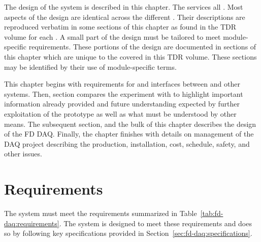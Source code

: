 The design of the    system is described in this chapter. 
The  services all  . 
Most aspects of the design are identical across the different .
Their descriptions are reproduced verbatim in some sections of this  chapter as found in the TDR volume for each .
A small part of the  design must be tailored to meet module-specific requirements. 
These portions of the design are documented in sections of this chapter which are unique to the  covered in this TDR volume. 
These sections may be identified by their use of module-specific terms.

This chapter begins with requirements for and interfaces between  and other  systems. 
Then, section compares the  experiment with  to highlight important information already provided and future understanding expected by further exploitation of the prototype as well as what must be understood by other means. 
The subsequent section, and the bulk of this chapter describes the design of the FD DAQ. 
Finally, the chapter finishes with details on management of the DAQ project describing the production, installation, cost, schedule, safety, and other issues.

\section{Requirements}
\label{sec:fd-daq:requirements}


The    system must meet the requirements 
summarized in Table~\ref{tab:fd-daq:requirements}. The system is
designed to meet these requirements and does so by following key
specifications provided in Section~\ref{sec:fd-daq:specifications}. 

% 



